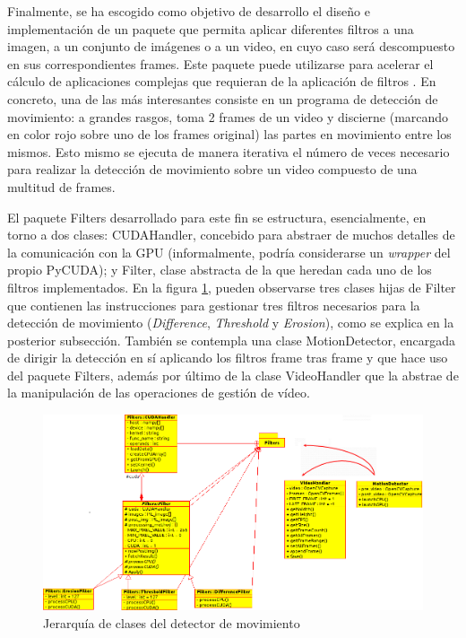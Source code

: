 \documentclass[twocolumn,twoside]{Jornadas}
\begin{document}
Finalmente, se ha escogido como objetivo de desarrollo el diseño e implementación de un paquete que permita aplicar diferentes filtros a una imagen, a un conjunto de imágenes o a un video, en cuyo caso será descompuesto en sus correspondientes frames. Este paquete puede utilizarse para acelerar el cálculo de aplicaciones complejas que requieran de la aplicación de filtros \cite{DBLP:conf/csse/YangZP08}. En concreto, una de las más interesantes consiste en un programa de detección de movimiento: a grandes rasgos, toma 2 frames de un video y discierne (marcando en color rojo sobre uno de los frames original) las partes en movimiento entre los mismos. Esto mismo se ejecuta de manera iterativa el número de veces necesario para realizar la detección de movimiento sobre un video compuesto de una multitud de frames.

\vspace{5 mm}

El paquete Filters desarrollado para este fin se estructura, esencialmente, en torno a dos clases: CUDAHandler, concebido para abstraer de muchos detalles de la comunicación con la GPU (informalmente, podría considerarse un \emph{wrapper} del propio  PyCUDA); y Filter, clase abstracta de la que heredan cada uno de los filtros implementados. En la figura \ref{fig:UML}, pueden observarse tres clases hijas de Filter que contienen las instrucciones para gestionar tres filtros necesarios para la detección de movimiento (\emph{Difference}, \emph{Threshold} y \emph{Erosion}), como se explica en la posterior subsección. También se contempla una clase MotionDetector, encargada de dirigir la detección en sí aplicando los filtros frame tras frame y que hace uso del paquete Filters, además por último de la clase VideoHandler que la abstrae de la manipulación de las operaciones de gestión de vídeo.

\begin{figure}
   \begin{center}
      \includegraphics[width=.5\textwidth]{UML.png}
      \caption{\label{fig:UML}Jerarquía de clases del detector de movimiento}
   \end{center}
\end{figure}
\end{document}
